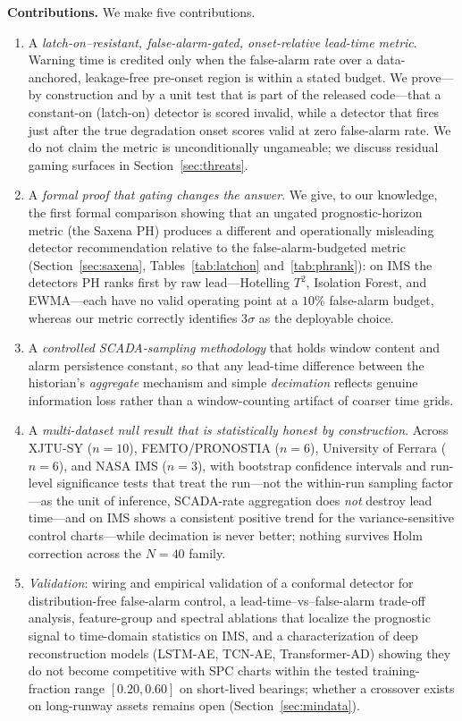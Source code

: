 \documentclass[journal]{IEEEtran}
\begin{document}
\textbf{Contributions.} We make five contributions.
\begin{enumerate}
\item A \emph{latch-on--resistant, false-alarm-gated, onset-relative lead-time
metric}. Warning time is credited only when the false-alarm rate over a
data-anchored, leakage-free pre-onset region is within a stated budget. We
prove---by construction and by a unit test that is part of the released code---that
a constant-on (latch-on) detector is scored invalid, while a detector that fires
just after the true degradation onset scores valid at zero false-alarm rate. We do
not claim the metric is unconditionally ungameable; we discuss residual gaming
surfaces in Section~\ref{sec:threats}.
\item A \emph{formal proof that gating changes the answer}. We give, to our
knowledge, the first formal comparison showing that an ungated prognostic-horizon
metric (the Saxena PH) produces a different and operationally misleading detector
recommendation relative to the false-alarm-budgeted metric
(Section~\ref{sec:saxena}, Tables~\ref{tab:latchon} and~\ref{tab:phrank}): on IMS
the detectors PH ranks first by raw lead---Hotelling $T^2$, Isolation Forest, and
EWMA---each have no valid operating point at a $10\%$ false-alarm budget, whereas
our metric correctly identifies 3$\sigma$ as the deployable choice.
\item A \emph{controlled SCADA-sampling methodology} that holds window content and
alarm persistence constant, so that any lead-time difference between the
historian's \emph{aggregate} mechanism and simple \emph{decimation} reflects
genuine information loss rather than a window-counting artifact of coarser time
grids.
\item A \emph{multi-dataset null result that is statistically honest by
construction}. Across XJTU-SY ($n{=}10$), FEMTO/PRONOSTIA ($n{=}6$), University of
Ferrara ($n{=}6$), and NASA IMS ($n{=}3$), with bootstrap confidence intervals and
run-level significance tests that treat the run---not the within-run sampling
factor---as the unit of inference, SCADA-rate aggregation does \emph{not} destroy
lead time---and on IMS shows a consistent positive trend for the
variance-sensitive control charts---while decimation is never better; nothing
survives Holm correction across the $N{=}40$ family.
\item \emph{Validation}: wiring and empirical validation of a conformal detector
for distribution-free false-alarm control, a lead-time--vs--false-alarm trade-off
analysis, feature-group and spectral ablations that localize the prognostic signal
to time-domain statistics on IMS, and a characterization of deep reconstruction
models (LSTM-AE, TCN-AE, Transformer-AD) showing they do not become competitive
with SPC charts within the tested training-fraction range $[0.20, 0.60]$ on
short-lived bearings; whether a crossover exists on long-runway assets remains
open (Section~\ref{sec:mindata}).
\end{enumerate}
\end{document}
